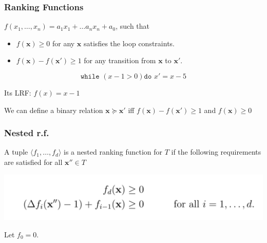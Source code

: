 \documentclass[11pt]{beamer}
\begin{document}
\begin{frame}\frametitle{Ranking Functions}

\begin{definition}

$f(x_1, \ldots, x_n) = a_1x_1 + \ldots a_nx_n + a_0$, such that

\begin{itemize}
\item $f(\textbf{x}) \ge 0$ for any $\textbf{x}$ satisfies the loop constraints.

\item $f(\textbf{x}) - f(\textbf{x}') \ge 1$ for any transition from $\textbf{x}$ to $\textbf{x}'$.



\end{itemize}
\end{definition}

\begin{example}
\[\texttt{while }( x - 1 > 0) \texttt{do } x' = x - 5\]

Its LRF: $f(x) = x - 1$
\end{example}

We can define a binary relation $\textbf{x} \succeq \textbf{x}'$ iff  $f(\textbf{x}) - f(\textbf{x}') \ge 1$ and $f(\textbf{x}) \ge 0$

\end{frame}

\begin{frame}\frametitle{Nested r.f.}

\begin{definition}

A tuple $\langle f_1, \ldots, f_d\rangle$ is a nested ranking function for $T$ if the following requirements are satisfied for all $\textbf{x}''\in T$
\begin{center}
\includegraphics[scale = 0.3]{6.PNG}

\end{center}

Let $f_0 = 0$.
\end{definition}


\end{frame}
\end{document}
